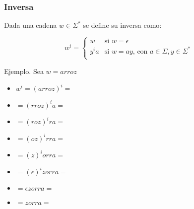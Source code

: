 \begin{frame}
  \frametitle{Inversa}
      \begin{defi}
			Dada una cadena $w\in \Sigma^*$ se define su inversa como:


                   \begin{displaymath}
                   w^i = \left\{ \begin{array}{ll}
                                  w & \textrm{si $w = \epsilon$} \\
                                  y^ia & \textrm{si $w=ay$, con $a \in \Sigma, y \in \Sigma^*$} \\
                                  \end{array} \right.
                   \end{displaymath}
      \end{defi}
      \pause


      \begin{block}{Ejemplo. Sea $w = arroz$}
           \begin{itemize}[<+->]
           \item $w^i = (arroz)^i =$
           \item $= (rroz)^i a =$
           \item $= (roz)^i ra =$
           \item $= (oz)^i rra =$
           \item $= (z)^i orra =$
           \item $= (\epsilon)^i zorra =$
           \item $= \epsilon zorra =$
           \item $= zorra =$
           \end{itemize}
			\end{block}
\end{frame}
